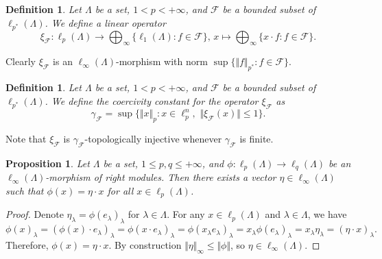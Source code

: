 \documentclass[12pt]{article}
\newtheorem{proposition}[theorem]{Proposition}
\newtheorem{definition}[theorem]{Definition}
\begin{document}
\begin{definition}\label{StdEmbd} 
    Let $\Lambda$ be a set, $1<p<+\infty$, 
    and $\mathcal{F}$ be a bounded subset of $\ell_{p^*}(\Lambda)$. We define 
    a linear operator
    \[
        \xi_{\mathcal{F}}: 
        \ell_p(\Lambda)\to\bigoplus_\infty\{\ell_1(\Lambda):f\in\mathcal{F}\},\,
        x \mapsto \bigoplus_\infty\{ x\cdot f: f\in\mathcal{F}\}.
    \]
\end{definition}

Clearly $\xi_{\mathcal{F}}$ is an $\ell_\infty(\Lambda)$-morphism with 
norm $\sup\{\Vert f\Vert_{p^*}: f\in\mathcal{F}\}$.

\begin{definition}\label{StdEmbdCoercv}
    Let $\Lambda$ be a set, $1<p<+\infty$, 
    and $\mathcal{F}$ be a bounded subset of $\ell_{p^*}(\Lambda)$. We define 
    the coercivity constant for the operator $\xi_{\mathcal{F}}$ as
    \[
        \gamma_{\mathcal{F}}=\sup\{
            \Vert x\Vert_p: 
            x\in\ell_p^n,\,\, \Vert \xi_{\mathcal{F}}(x)\Vert\leq 1
        \}.
    \]
\end{definition}

Note that $\xi_{\mathcal{F}}$ is $\gamma_{\mathcal{F}}$-topologically injective 
whenever $\gamma_{\mathcal{F}}$ is finite.

\begin{proposition}\label{LinfnMorphlpntolqnCharac}
    Let $\Lambda$ be a set, $1\leq p,q\leq +\infty$, 
    and $\phi:\ell_p(\Lambda)\to \ell_{q}(\Lambda)$ be 
    an $\ell_\infty(\Lambda)$-morphism of right modules. Then there exists a 
    vector $\eta\in\ell_\infty(\Lambda)$ such that $\phi(x)=\eta\cdot x$ 
    for all $x\in \ell_p(\Lambda)$.
\end{proposition}
\begin{proof}
    Denote $\eta_\lambda=\phi(e_\lambda)_\lambda$ for $\lambda\in\Lambda$. 
    For any $x\in\ell_p(\Lambda)$ and $\lambda\in\Lambda$, we have
    \[
        \phi(x)_\lambda
        =(\phi(x)\cdot e_\lambda)_\lambda
        =\phi(x\cdot e_\lambda)_\lambda
        =\phi(x_\lambda e_\lambda)_\lambda
        =x_\lambda\phi(e_\lambda)_\lambda
        =x_\lambda\eta_\lambda
        =(\eta\cdot x)_\lambda.
    \]
    Therefore, $\phi(x)=\eta\cdot x$. By 
    construction $\Vert\eta\Vert_\infty\leq\Vert\phi\Vert$, 
    so $\eta\in\ell_\infty(\Lambda)$.
\end{proof}
\end{document}

